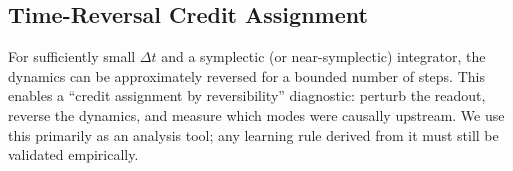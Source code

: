 \documentclass[11pt,a4paper]{article}
\newcommand{\dt}{\Delta t}
\begin{document}
\subsection{Time-Reversal Credit Assignment}
For sufficiently small $\dt$ and a symplectic (or near-symplectic) integrator, the dynamics can be approximately reversed for a bounded number of steps. This enables a ``credit assignment by reversibility'' diagnostic: perturb the readout, reverse the dynamics, and measure which modes were causally upstream. We use this primarily as an analysis tool; any learning rule derived from it must still be validated empirically.
\end{document}
